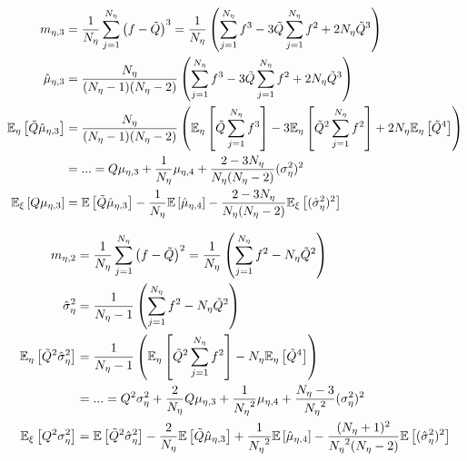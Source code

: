 \begin{equation}
    \begin{split}
        m_{\eta,3} &= \frac{1}{{N_\eta}}\sum_{j=1}^{N_\eta} \left(f-\tilde{Q}\right)^3 = \frac{1}{{N_\eta}}\left(\sum_{j=1}^{N_\eta} f^3 - 3\tilde{Q}\sum_{j=1}^{N_\eta} f^2 + 2{N_\eta}\tilde{Q}^3 \right) \\
        \hat{\mu}_{\eta,3} &= \frac{{N_\eta}}{({N_\eta}-1)({N_\eta}-2)}\left(\sum_{j=1}^{N_\eta} f^3 - 3\tilde{Q}\sum_{j=1}^{N_\eta} f^2 + 2{N_\eta}\tilde{Q}^3 \right) \\
        \mathbb{E}_\eta\left[\tilde{Q}\hat{\mu}_{\eta,3}\right] &= \frac{{N_\eta}}{({N_\eta}-1)({N_\eta}-2)} \left( \mathbb{E}_\eta\left[\tilde{Q}\sum_{j=1}^{N_\eta} f^3\right] - 3\mathbb{E}_\eta\left[\tilde{Q}^2\sum_{j=1}^{N_\eta} f^2\right] + 2{N_\eta}\mathbb{E}_\eta\left[\tilde{Q}^4\right]\right) \\
        &= ... = Q\mu_{\eta,3} + \frac{1}{{N_\eta}}\mu_{\eta,4} + \frac{2-3{N_\eta}}{{N_\eta}({N_\eta}-2)}(\sigma^2_\eta)^2\\
        \mathbb{E}_\xi\left[Q\mu_{\eta,3}\right] &= \mathbb{E}\left[\tilde{Q} \hat{\mu}_{\eta,3}\right] - \frac{1}{{N_\eta}}\mathbb{E}\left[\hat{\mu}_{\eta,4}\right] - \frac{2-3{N_\eta}}{{N_\eta}({N_\eta}-2)}\mathbb{E}_\xi\left[(\hat{\sigma}^2_\eta)^2\right]
    \end{split}
\end{equation}


\begin{equation}
    \begin{split}
        m_{\eta,2} &= \frac{1}{{N_\eta}}\sum_{j=1}^{N_\eta} \left(f-\tilde{Q}\right)^2 = \frac{1}{{N_\eta}}\left(\sum_{j=1}^{N_\eta} f^2 - {N_\eta}\tilde{Q}^2\right) \\
        \hat{\sigma}^2_\eta &= \frac{1}{{N_\eta}-1}\left(\sum_{j=1}^{N_\eta} f^2 - {N_\eta}\tilde{Q}^2\right) \\
        \mathbb{E}_\eta\left[\tilde{Q}^2\hat{\sigma}^2_\eta\right] &= \frac{1}{{N_\eta}-1}\left( \mathbb{E}_\eta\left[\tilde{Q}^2\sum_{j=1}^{N_\eta} f^2\right] - {N_\eta}\mathbb{E}_\eta\left[\tilde{Q}^4\right]\right) \\
        &= ... = Q^2\sigma^2_\eta + \frac{2}{{N_\eta}}Q\mu_{\eta,3} + \frac{1}{{N_\eta}^2}\mu_{\eta,4} + \frac{{N_\eta}-3}{{N_\eta}^2}(\sigma^2_\eta)^2\\
        \mathbb{E}_\xi\left[Q^2\sigma^2_\eta\right] &= \mathbb{E}\left[\tilde{Q}^2 \hat{\sigma}^2_\eta\right] - \frac{2}{{N_\eta}}\mathbb{E}\left[\tilde{Q} \hat{\mu}_{\eta,3}\right] + \frac{1}{{N_\eta}^2}\mathbb{E}\left[\hat{\mu}_{\eta,4}\right] - \frac{({N_\eta}+1)^2}{{N_\eta}^2({N_\eta}-2)}\mathbb{E}\left[(\hat{\sigma}^2_\eta)^2\right]
    \end{split}
\end{equation}


